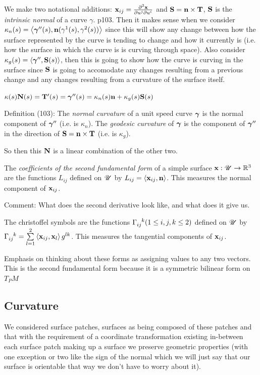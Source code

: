 We make two notational additions: $\mathbf{x}_{ij} = \frac{\partial^2\mathbf{x}}{\partial u^j \partial u^i}$ and $\mathbf{S} = \mathbf{n} \times \mathbf{T}$, $\mathbf{S}$ is the \emph{intrinsic normal} of a curve $\gamma$. p103. Then it makes sense when we consider $\kappa_n(s) = \left\langle\boldsymbol{\gamma}^{\prime\prime}(s), \mathbf{n}(\gamma^1(s), \gamma^2(s))\right\rangle$ since this will show any change between how the surface represented by the curve is tending to change and how it currently is (i.e. how the surface in which the curve is is curving through space). Also consider $\kappa_g(s) = \left\langle\boldsymbol{\gamma}^{\prime\prime}, \mathbf{S}(s)\right\rangle$, then this is going to show how the curve is curving in the surface since $\mathbf{S}$ is going to accomodate any changes resulting from a previous change and any changes resulting from a curvature of the surface itself.

$\kappa(s)\mathbf{N}(s) = \mathbf{T}^\prime(s) = \boldsymbol{\gamma}^{\prime\prime}(s) = \kappa_n(s)\mathbf{n} + \kappa_g(s)\mathbf{S}(s)$

Definition (103): The \emph{normal curvature} of a unit speed curve $\boldsymbol{\gamma}$ is the normal component of $\boldsymbol{\gamma}^{\prime\prime}$ (i.e. is $\kappa_n$). The \emph{geodesic curvature} of $\boldsymbol{\gamma}$ is the component of $\boldsymbol{\gamma}^{\prime\prime}$ in the direction of $\mathbf{S} = \mathbf{n} \times \mathbf{T}$ (i.e. is $\kappa_g$).

So then this $\mathbf{N}$ is a linear combination of the other two.

The \emph{coefficients of the second fundamental form} of a simple surface $\mathbf{x}: \mathscr{U} \to \mathbb{R}^3$ are the functions $L_{ij}$ defined on $\mathscr{U}$ by $L_{ij} = \left\langle\mathbf{x}_{ij}, \mathbf{n}\right\rangle$. This measures the normal component of $\mathbf{x}_{ij}$.

Comment: What does the second derivative look like, and what does it give us.

The christoffel symbols are the functions $\Cfl (1 \le i, j, k \le 2)$ defined on $\mathscr{U}$ by $\Cfl = \sum\limits_{l = 1}^2 \left\la \bx_{ij}, \bx_{l}\right\ra g^{lk}$. This measures the tangential components of $\mathbf{x}_{ij}$.

Emphasis on thinking about these forms as assigning values to any two vectors. This is the second fundamental form because it is a symmetric bilinear form on $T_P M$


\subsection{Curvature}

We considered surface patches, surfaces as being composed of these patches and that with the requirement of a coordinate transformation existing in-between each surface patch making up a surface we preserve geometric properties (with one exception or two like the sign of the normal which we will just say that our surface is orientable that way we don't have to worry about it). 

